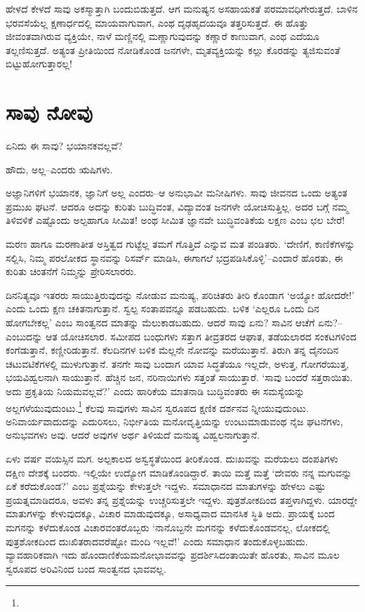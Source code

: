ಹೇಳದೆ ಕೇಳದೆ ಸಾವು ಅಕಸ್ಮಾತ್ತಾಗಿ ಬಂದುಬಿಡುತ್ತದೆ. ಆಗ ಮನುಷ್ಯನ ಅಸಹಾಯಕತೆ ಪರಮಾವಧಿಗೇರುತ್ತದೆ. ಬಾಳಿನ ಭರವಸೆಯೆಲ್ಲ ಕ್ಷಣಾರ್ಧದಲ್ಲಿ ಮಾಯವಾಗುವಾಗ, ಎಂಥ ದೃಢಹೃದಯವೂ ತತ್ತರಿಸುತ್ತದೆ. ಈ ಹೊತ್ತು ಜೀವಂತವಾಗಿರುವ ವ್ಯಕ್ತಿಯೇ, ನಾಳೆ ಮಣ್ಣಿನಲ್ಲಿ ಮಣ್ಣಾಗುವುದನ್ನು ಕಣ್ಣಾರೆ ಕಾಣುವಾಗ, ಎಂಥ ಎದೆಯೂ ತಲ್ಲಣಿಸುತ್ತದೆ. ಅತ್ಯಂತ ಪ್ರೀತಿಯಿಂದ ನೋಡಿಕೊಂಡ ಜನಗಳೇ, ಮೃತವ್ಯಕ್ತಿಯನ್ನು ಕಲ್ಲು ಕೊರಡನ್ನು ತ್ಯಜಿಸುವಂತೆ ಬಿಟ್ಟು\break ಹೋಗುತ್ತಾರಲ್ಲ!


\section*{ಸಾವು ನೋವು}


ಏನಿದು ಈ ಸಾವು? ಭಯಾನಕವಲ್ಲವೆ?

ಹೌದು, ಅಲ್ಲ–ಎಂದರು ಋಷಿಗಳು.

ಅಜ್ಞಾನಿಗಳಿಗೆ ಭಯಾನಕ, ಜ್ಞಾನಿಗೆ ಅಲ್ಲ ಎಂದರು–ಆ ಅನುಭಾವೀ ಮನೀಷಿಗಳು. ಸಾವು ಜೀವನದ ಒಂದು ಅತ್ಯಂತ ಪ್ರಮುಖ ಘಟನೆ. ಆದರೂ ಅದನ್ನು ಕುರಿತು ಬುದ್ಧಿವಂತ, ವಿದ್ಯಾವಂತ ಜನಗಳೇ ಯೋಚಿಸುತ್ತಿಲ್ಲ. ಅದರ ಬಗ್ಗೆ ನಮ್ಮ ತಿಳಿವಳಿಕೆ ಎಷ್ಟೊಂದು ಅಲ್ಪ\break ಹಾಗೂ ಸೀಮಿತ! ಅಂಥ ಸೀಮಿತ ಜ್ಞಾನವೇ ಬುದ್ಧಿವಂತಿಕೆಯ ಲಕ್ಷಣ ಎಂಬ ಛಲ ಬೇರೆ!

ಮರಣ ಹಾಗೂ ಮರಣಾತೀತ ಅಸ್ತಿತ್ವದ ಗುಟ್ಟೆಲ್ಲ ತಮಗೆ ಗೊತ್ತಿದೆ ಎನ್ನುವ ಮತ ಪಂಡಿತರು. ‘ದೇಣಿಗೆ, ಕಾಣಿಕೆಗಳನ್ನು ಸಲ್ಲಿಸಿ, ನಿಮ್ಮ ಪರಲೋಕದ ಸ್ಥಾನವನ್ನು ರಿಸರ್ವ್ ಮಾಡಿಸಿ, ಈಗಾಗಲೆ ಭದ್ರಪಡಿಸಿಕೊಳ್ಳಿ’–ಎಂದಾರೆ ಹೊರತು, ಈ ಕುರಿತು ಚಿಂತನೆಗೆ ನಿಮ್ಮನ್ನು ಪ್ರೇರಿಸಲಾರರು.

ದಿನನಿತ್ಯವೂ ಇತರರು ಸಾಯುತ್ತಿರುವುದನ್ನು ನೋಡುವ ಮನುಷ್ಯ, ಪರಿಚಿತರು ತೀರಿ ಕೊಂಡಾಗ ‘ಅಯ್ಯೋ ಹೋದರೇ!’ ಎಂದು ಒಂದು ಕ್ಷಣ ಚಕಿತನಾಗುತ್ತಾನೆ. ಸ್ವಲ್ಪ ಸಂತಾಪವನ್ನೂ ಪಡಬಹುದು. ಬಳಿಕ ‘ಎಲ್ಲರೂ ಒಂದು ದಿನ ಹೋಗಬೇಕಲ್ಲ’ ಎಂಬ ಸಾಂತ್ವನದ ಮಾತನ್ನು ಮೆಲುಕಾಡಬಹುದು. ಆದರೆ ಸಾವು ಏನು? ಸಾವಿನ ಆಚೆಗೆ ಏನು?–ಎಂಬುದನ್ನು ಆತ ಯೋಚಿಸಲಾರ. ಸಮೀಪದ ಬಂಧುಗಳು ಸತ್ತಾಗ ತೀವ್ರತರದ ಆಘಾತ, ತಡೆಯಲಾರದ ಸಂಕಟಗಳಿಂದ ಕಂಗೆಡುತ್ತಾನೆ, ಕಣ್ಣೀರಿಡುತ್ತಾನೆ. ಕೆಲದಿನಗಳ ಬಳಿಕ ಮೆಲ್ಲನೇ ನೋವನ್ನು ಮರೆಯುತ್ತಾನೆ. ತಿರುಗಿ ತನ್ನ ದೈನಂದಿನ ಚಟುವಟಿಕೆಗಳಲ್ಲಿ ಮುಳುಗುತ್ತಾನೆ. ತನಗೇ ಸಾವು ಬಂದಾಗ ಯಾವ ಸಿದ್ಧತೆಯೂ ಇಲ್ಲದೇ, ಅಳುತ್ತ, ಗೋಗರೆಯುತ್ತ, ಭಯವಿಹ್ವಲನಾಗಿ ಸಾಯುತ್ತಾನೆ. ಹೆಚ್ಚಿನ ಜನ, ನರಿನಾಯಿಗಳು ಸತ್ತಂತೆ ಸಾಯುತ್ತಾರೆ. ‘ಸಾವು ಬಂದರೆ ಸತ್ತರಾಯಿತು. ಅದು ಪ್ರಕೃತಿಯ ನಿಯಮವಲ್ಲವೆ?’ ಎಂದು ಹಾರಿಕೆಯ ಮಾತನಾಡಿ ಬುದ್ಧಿವಂತರು ಈ ಸಮಸ್ಯೆಯನ್ನು ಅಲ್ಲಗಳೆಯುವುದುಂಟು.\footnote{\hfill{}} ಕೆಲವು ಸಾವುಗಳು ಸಾವಿನ ಸ್ವರೂಪದ ಕ್ಷಣಿಕ ದರ್ಶನವ ನ್ನೀಯುವುದುಂಟು. ಅನಿವಾರ್ಯವಾದುದನ್ನು ಎದುರಿಸಲು, ನಿರ್ಭೀತಿಯ ಮನೋವೃತ್ತಿಯನ್ನು ಉಂಟುಮಾಡುವಂಥ ನೈಜ ಘಟನೆಗಳು, ಅನುಭವಗಳು ಅವು. ಆದರೆ ಅವುಗಳ ಅರ್ಥ ತಿಳಿಯದೆ ಮನುಷ್ಯ ವಿಹ್ವಲನಾಗುತ್ತಾನೆ.

ಏಳು ವರ್ಷ ವಯಸ್ಸಿನ ಮಗ. ಅಲ್ಪಕಾಲದ ಅಸ್ವಸ್ಥತೆಯಿಂದ ತೀರಿಕೊಂಡ. ದುಃಖವನ್ನು ಮರೆಯಲು ದಂಪತಿಗಳು ದಕ್ಷಿಣ ದೇಶಕ್ಕೆ ಬಂದರು. ಇಲ್ಲಿಯೇ ಉದ್ಯೋಗ ಮಾಡಿಕೊಂಡಿದ್ದಾರೆ. ತಾಯಿ ಮತ್ತೆ ಮತ್ತೆ ‘ದೇವರು ನನ್ನ ಮಗುವನ್ನು ಏಕೆ ಕರೆದುಕೊಂಡ?’ ಎಂಬ ಪ್ರಶ್ನೆಯನ್ನು ಕೇಳುತ್ತಲೇ ಇದ್ದಳು. ಸಮಾಧಾನದ ಮಾತುಗಳನ್ನು ಹೇಳಲು ಎಷ್ಟು ಪ್ರಯತ್ನಮಾಡಿದರೂ, ಅವಳು ತನ್ನ ಪ್ರಶ್ನೆಯನ್ನು ಉಚ್ಚರಿಸುತ್ತಲೇ ಇದ್ದಳು. ಪುತ್ರಶೋಕದಿಂದ ತಪ್ತಳಾಗಿದ್ದಳು. ಯಾರದ್ದೇ ಮಾತುಗಳನ್ನು ಕೇಳುವುದಕ್ಕೂ, ವಿಚಾರ ಮಾಡುವುದಕ್ಕೂ, ಅಸಾಧ್ಯವಾದ ಮಾನಸಿಕ ಸ್ಥಿತಿ ಅದು. ಪ್ರಾಯಕ್ಕೆ ಬಂದ ಮಗನನ್ನು ಕಳೆದುಕೊಂಡ ವಿಚಾರವಂತರೊಬ್ಬರು ‘ನಾನೊಬ್ಬನೇ ಮಗನನ್ನು ಕಳೆದುಕೊಂಡವನಲ್ಲ, ಲೋಕದಲ್ಲಿ ಪುತ್ರಶೋಕದಿಂದ ದುಃಖಿತರಾದವರೆಷ್ಟೋ ಮಂದಿ ಇಲ್ಲವೆ!’ ಎಂದು ಸಮಾಧಾನ ತಂದುಕೊಳ್ಳಬಹುದು. ವ್ಯಾವಹಾರಿಕವಾಗಿ ಇದು ಹೊಂದಾಣಿಕೆಯ\break ಮನೋಭಾವ\-ವನ್ನು ಪ್ರದರ್ಶಿಸಿದಂತಾಯಿತೇ ಹೊರತು, ಸಾವಿನ ಮೂಲ ಸ್ವರೂಪದ ಅರಿವಿನಿಂದ ಬಂದ ಸಾಂತ್ವನದ ಭಾವವಲ್ಲ.


